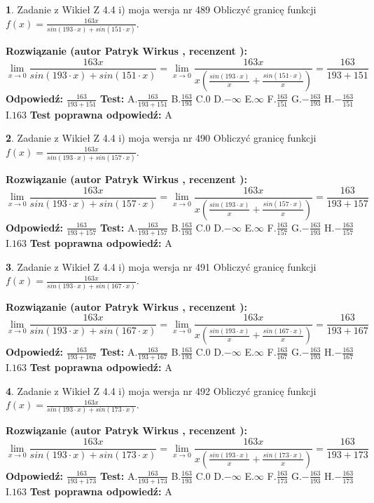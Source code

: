 \documentclass[12pt, a4paper]{article}
\theoremstyle{definition} %
\newtheorem{zad}{}
\newcommand{\zadStart}[1]{\begin{zad}#1\newline}
\newcommand{\zadStop}{\end{zad}}
\newcommand{\rozwStart}[2]{\noindent \textbf{Rozwiązanie (autor #1 , recenzent #2): }\newline}
\newcommand{\rozwStop}{\newline}
\newcommand{\odpStart}{\noindent \textbf{Odpowiedź:}\newline}
\newcommand{\odpStop}{\newline}
\newcommand{\testStart}{\noindent \textbf{Test:}\newline}
\newcommand{\testStop}{\newline}
\newcommand{\kluczStart}{\noindent \textbf{Test poprawna odpowiedź:}\newline}
\newcommand{\kluczStop}{\newline}
\begin{document}
\zadStart{Zadanie z Wikieł Z 4.4 i) moja wersja nr 489}
Obliczyć granicę funkcji $f(x)=\frac{163x}{sin(193\cdot x) +sin(151\cdot x)}$.
\zadStop
\rozwStart{Patryk Wirkus}{}
$$\lim\limits_{x\to 0}\frac{163x}{sin(193\cdot x) +sin(151\cdot x)}=\lim\limits_{x\to 0}\frac{163x}{x(\frac{sin(193\cdot x)}{x}+\frac{sin(151\cdot x)}{x})}=\frac{163}{193+151}$$
\rozwStop
\odpStart
$\frac{163}{193+151}$
\odpStop
\testStart
A.$\frac{163}{193+151}$
B.$\frac{163}{193}$
C.$0$
D.$-\infty$
E.$\infty$
F.$\frac{163}{151}$
G.$-\frac{163}{193}$
H.$-\frac{163}{151}$
I.$163$
\testStop
\kluczStart
A
\kluczStop



\zadStart{Zadanie z Wikieł Z 4.4 i) moja wersja nr 490}
Obliczyć granicę funkcji $f(x)=\frac{163x}{sin(193\cdot x) +sin(157\cdot x)}$.
\zadStop
\rozwStart{Patryk Wirkus}{}
$$\lim\limits_{x\to 0}\frac{163x}{sin(193\cdot x) +sin(157\cdot x)}=\lim\limits_{x\to 0}\frac{163x}{x(\frac{sin(193\cdot x)}{x}+\frac{sin(157\cdot x)}{x})}=\frac{163}{193+157}$$
\rozwStop
\odpStart
$\frac{163}{193+157}$
\odpStop
\testStart
A.$\frac{163}{193+157}$
B.$\frac{163}{193}$
C.$0$
D.$-\infty$
E.$\infty$
F.$\frac{163}{157}$
G.$-\frac{163}{193}$
H.$-\frac{163}{157}$
I.$163$
\testStop
\kluczStart
A
\kluczStop



\zadStart{Zadanie z Wikieł Z 4.4 i) moja wersja nr 491}
Obliczyć granicę funkcji $f(x)=\frac{163x}{sin(193\cdot x) +sin(167\cdot x)}$.
\zadStop
\rozwStart{Patryk Wirkus}{}
$$\lim\limits_{x\to 0}\frac{163x}{sin(193\cdot x) +sin(167\cdot x)}=\lim\limits_{x\to 0}\frac{163x}{x(\frac{sin(193\cdot x)}{x}+\frac{sin(167\cdot x)}{x})}=\frac{163}{193+167}$$
\rozwStop
\odpStart
$\frac{163}{193+167}$
\odpStop
\testStart
A.$\frac{163}{193+167}$
B.$\frac{163}{193}$
C.$0$
D.$-\infty$
E.$\infty$
F.$\frac{163}{167}$
G.$-\frac{163}{193}$
H.$-\frac{163}{167}$
I.$163$
\testStop
\kluczStart
A
\kluczStop



\zadStart{Zadanie z Wikieł Z 4.4 i) moja wersja nr 492}
Obliczyć granicę funkcji $f(x)=\frac{163x}{sin(193\cdot x) +sin(173\cdot x)}$.
\zadStop
\rozwStart{Patryk Wirkus}{}
$$\lim\limits_{x\to 0}\frac{163x}{sin(193\cdot x) +sin(173\cdot x)}=\lim\limits_{x\to 0}\frac{163x}{x(\frac{sin(193\cdot x)}{x}+\frac{sin(173\cdot x)}{x})}=\frac{163}{193+173}$$
\rozwStop
\odpStart
$\frac{163}{193+173}$
\odpStop
\testStart
A.$\frac{163}{193+173}$
B.$\frac{163}{193}$
C.$0$
D.$-\infty$
E.$\infty$
F.$\frac{163}{173}$
G.$-\frac{163}{193}$
H.$-\frac{163}{173}$
I.$163$
\testStop
\kluczStart
A
\kluczStop
\end{document}

